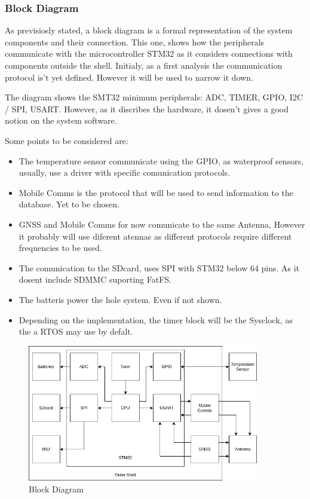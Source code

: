 \subsubsection{Block Diagram}

As previsiosly stated, a block diagram is a formal representation of the system components
and their connection. This one, shows how the peripherals communicate with the microcontroller STM32
as it considers connections with components outside the shell. Initialy, as a first analysis
the communication protocol is't yet defined. However it will be used to narrow it down.

The diagram shows the SMT32 minimum peripherals: ADC, TIMER, GPIO, I2C / SPI, USART. However,
as it discribes the hardware, it dosen't gives a good notion on the system software. 

Some points to be considered are:
\begin{itemize}
    \item The temperature sensor communicate using the GPIO, as waterproof sensors, usually, use a driver with specific
    comunication protocols.
    \item Mobile Comms is the protocol that will be used to send information to the database. Yet to be chosen. 
    \item GNSS and Mobile Comms for now comunicate to the same Antenna, However it probably will use diferent atennas as different
    protocols require different frequencies to be used.
    \item The comunication to the SDcard, uses SPI with STM32 below 64 pins. As it dosent include SDMMC suporting FatFS.
    \item The batteris power the hole system. Even if not shown.
    \item Depending on the implementation, the timer block will be the Sysclock, as the a RTOS may use by defalt.
\end{itemize}

\begin{figure}[H]
    \centering
    \includegraphics[width=0.9\textwidth]{images/diagrams/block_diagram/block_diagrams_3/blockdiagram_analysis.drawio.png}  %
    \caption{Block Diagram}
    \label{fig:Block Diagram}        
\end{figure}

